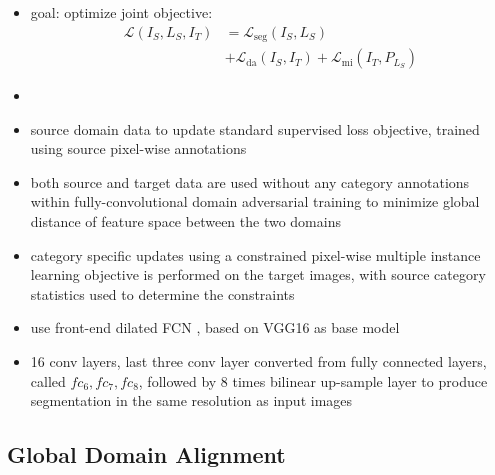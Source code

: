\begin{itemize}
	\item goal: optimize joint objective:
	\begin{align}
		\mathcal{L}(I_S,L_S,I_T) &= \mathcal{L}_{\text{seg}}(I_S, L_S)\\
		&+ \mathcal{L}_{\text{da}}(I_S, I_T) + \mathcal{L}_{\text{mi}}(I_T,P_{L_S})
	\end{align}
	\item {}
	\item source domain data to update standard supervised loss objective, trained using source pixel-wise annotations
	\item both source and target data are used without any category annotations within fully-convolutional domain adversarial training to minimize global distance of feature space between the two domains
	\item category specific updates using a constrained pixel-wise multiple instance learning objective is performed on the target images, with source category statistics used to determine the constraints
	\item use front-end dilated FCN , based on VGG16  as base model
	\item 16 conv layers, last three conv layer converted from fully connected layers, called $f c_6, f c_7, f c_8$, followed by 8 times bilinear up-sample layer to produce segmentation in the same resolution as input images
\end{itemize}

\subsection{Global Domain Alignment}

